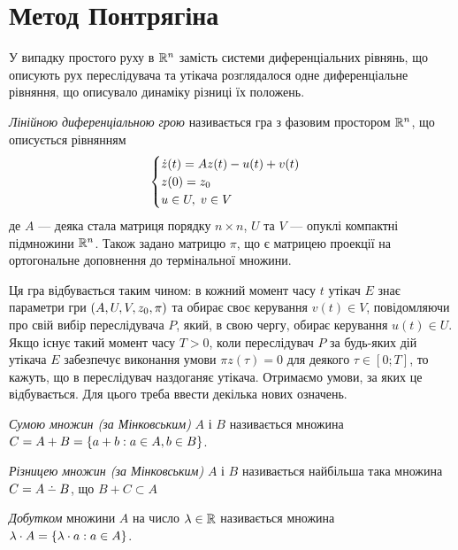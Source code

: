 \section{Метод Понтрягіна}
У випадку простого руху в $\mathbb{R}^n$ замість системи диференціальних рівнянь,
що описують рух переслідувача та утікача розглядалося
одне диференціальне рівняння, що описувало динаміку різниці їх положень.
\begin{definition}
    \emph{Лінійною диференціальною грою} називається гра з фазовим простором
    $\mathbb{R}^n$, що описується рівнянням
    \begin{gather}\label{lin_game}
        \begin{cases}
            \dot{z}(t) = A z(t) - u(t) + v(t) \\
            z(0) = z_0 \\
            u \in U, \; v \in V
        \end{cases}
    \end{gather}
    де $A$ --- деяка стала матриця порядку $n\times n$, $U$ та $V$ --- опуклі компактні
    підмножини $\mathbb{R}^n$. Також задано матрицю $\pi$, що є матрицею проекції на ортогональне доповнення до термінальної множини.
\end{definition}
Ця гра відбувається таким чином: в кожний момент часу $t$ утікач $E$ знає параметри гри
$\left(A, U, V, z_0, \pi \right)$ та обирає своє керування $v(t) \in V$, повідомляючи про свій вибір
переслідувача $P$, який, в свою чергу, обирає керування $u(t) \in U$.
Якщо існує такий момент часу $T > 0$, коли переслідувач $P$ за будь-яких дій
утікача $E$ забезпечує виконання умови $\pi z(\tau) = 0$ для деякого
$\tau \in [0; T]$, то кажуть, що в переслідувач наздоганяє утікача.
Отримаємо умови, за яких це відбувається. Для цього треба ввести декілька нових означень.
\begin{definition}
    \emph{Сумою множин (за Мінковським)} $A$ і $B$ називається множина
    $C = A + B = \left\{ a + b : a \in A, b \in B\right\}$.
\end{definition}
\begin{definition}
    \emph{Різницею множин (за Мінковським)} $A$ і $B$ називається найбільша така множина
    $C = A \setdif B$, що $B + C \subset A$
\end{definition}
\begin{definition}
    \emph{Добутком} множини $A$ на число $\lambda \in \mathbb{R}$ називається множина
    $\lambda \cdot A = \left\{\lambda \cdot a : a \in A \right\}$.
\end{definition}
